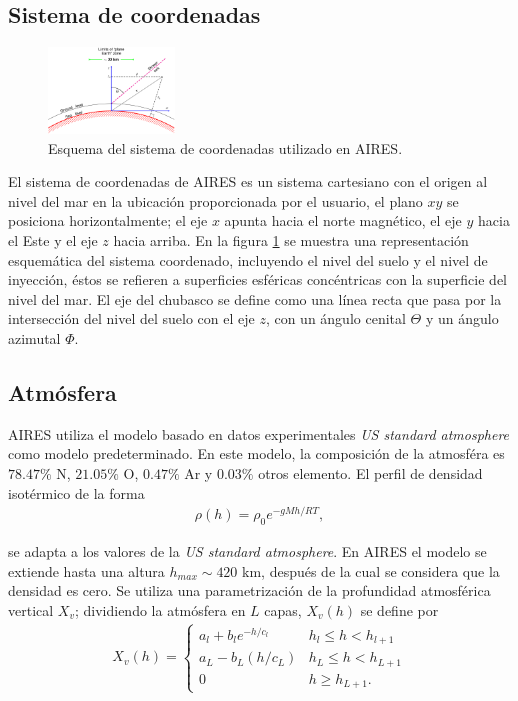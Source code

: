 	
	\subsection{Sistema de coordenadas}
	\begin{figure}
	\includegraphics[width=0.3\textwidth]{Figuras/coordinates} 
	\caption{Esquema del sistema de coordenadas utilizado en AIRES.}
	\label{fig:coordinates}
	\end{figure}		
	El sistema de coordenadas de AIRES es un sistema cartesiano con el origen al nivel del mar en la ubicación proporcionada por el usuario, el plano $xy$ se posiciona horizontalmente; el eje $x$ apunta hacia el norte magnético, el eje $y$ hacia el Este y el eje $z$ hacia arriba. En la figura \ref{fig:coordinates} se muestra una representación esquemática del sistema coordenado, incluyendo el nivel del suelo y el nivel de inyección, éstos se refieren a superficies esféricas concéntricas con la superficie del nivel del mar. El eje del chubasco se define como una línea recta que pasa por la intersección del nivel del suelo con el eje $z$, con un ángulo cenital $\Theta$ y un ángulo azimutal $\Phi$.
	
	\subsection{Atmósfera}
	AIRES utiliza el modelo basado en datos experimentales \textit{US standard atmosphere} como modelo predeterminado. En este modelo, la composición de la atmosféra es $78.47\%$ N, $21.05\%$ O, $0.47\%$ Ar y $0.03\%$ otros elemento. El perfil de densidad isotérmico de la forma
	\begin{align*}
	\rho (h) = \rho_0 e^{-gMh/RT},
	\end{align*}
	
	se adapta a los valores de la \textit{US standard atmosphere}. En AIRES el modelo se extiende hasta una altura $h_{max} \sim 420$ km, después de la cual se considera que la densidad es cero. Se utiliza una parametrización de la profundidad atmosférica vertical $X_v$; dividiendo la atmósfera en $L$ capas, $X_v (h)$ se define por 
	\begin{align}
	X_v (h) = \begin{cases}
	a_l + b_l e^{-h/c_l} & h_l \leq h < h_{l+1} \\
	a_L - b_L (h/c_L) & h_L \leq h < h_{L+1} \\
	0 & h \geq h_{L+1}.
	\end{cases}
	\end{align}
	
